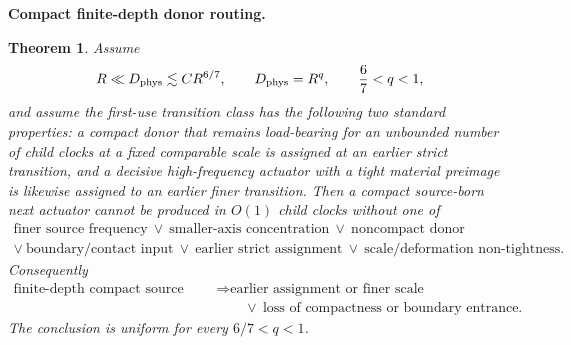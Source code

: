 \documentclass[11pt]{article}
\newtheorem{theorem}{Theorem}[section]
\theoremstyle{definition}\newtheorem{definition}[theorem]{Definition}
\theoremstyle{remark}\newtheorem{remark}[theorem]{Remark}
\begin{document}
\medskip
\noindent\textbf{Compact finite-depth donor routing.}
\begin{theorem}\label{thm:quniform}
Assume
\[
 R\ll D_{\rm phys}\lesssim C R^{6/7},
 \qquad
 D_{\rm phys}=R^q,
 \qquad
 \frac67<q<1,
\]
and assume the first-use transition class has the following two standard
properties: a compact donor that remains load-bearing for an unbounded number
of child clocks at a fixed comparable scale is assigned at an earlier strict
transition, and a decisive high-frequency actuator with a tight material
preimage is likewise assigned to an earlier finer transition.  Then a compact
source-born next actuator cannot be produced in $O(1)$ child clocks without
one of
\[
\boxed{\begin{gathered}
\text{finer source frequency}\ \vee\ \text{smaller-axis concentration}
\ \vee\ \text{noncompact donor}\\
\vee\ \text{boundary/contact input}\ \vee\ \text{earlier strict assignment}
\ \vee\ \text{scale/deformation non-tightness}.
\end{gathered}}
\]
Consequently
\[
\boxed{\begin{aligned}
 \text{finite-depth compact source birth}
 &\Longrightarrow \text{earlier assignment or finer scale}\\
 &\qquad\vee\ \text{loss of compactness or boundary entrance}.
\end{aligned}}
\]
The conclusion is uniform for every $6/7<q<1$.
\end{theorem}
\end{document}

